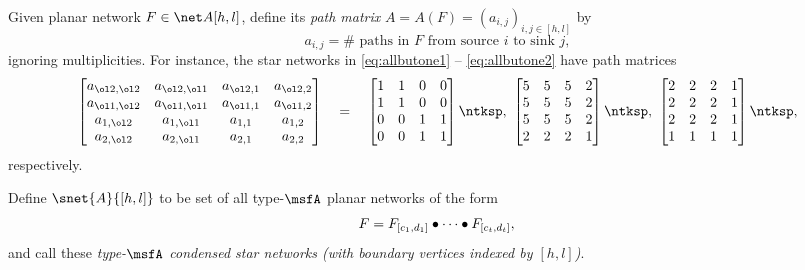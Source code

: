 Given planar network $F \in \net A{[h,l]}$, define
its {\em path matrix} $A = A(F) = (a_{i,j})_{i,j \in [h,l]}$ by
\begin{equation}\label{eq:pathmatrix}
  a_{i,j} = \# \text{ paths in $F$ from source $i$ to sink $j$},
\end{equation}
ignoring multiplicities.
For instance, the star networks in
\eqref{eq:allbutone1} -- \eqref{eq:allbutone2}
have path matrices
\begin{equation*}
  \begin{bmatrix}
    a_{\ol2,\ol2} & a_{\ol2, \ol1} & a_{\ol2, 1} & a_{\ol2, 2} \\
    a_{\ol1,\ol2} & a_{\ol1, \ol1} & a_{\ol1, 1} & a_{\ol1, 2} \\
    a_{1,\ol2}   & a_{1, \ol1}   & a_{1, 1}   & a_{1, 2} \\
    a_{2,\ol2}   & a_{2, \ol1}   & a_{2, 1}   & a_{2, 2} 
  \end{bmatrix}
  \quad
  = 
  \quad
  \begin{bmatrix}
    1 & 1 & 0 & 0 \\
    1 & 1 & 0 & 0 \\
    0 & 0 & 1 & 1 \\
    0 & 0 & 1 & 1     
  \end{bmatrix}\ntksp,
  \
  \begin{bmatrix}
    5 & 5 & 5 & 2 \\
    5 & 5 & 5 & 2 \\
    5 & 5 & 5 & 2 \\
    2 & 2 & 2 & 1
  \end{bmatrix}\ntksp,
  \
  \begin{bmatrix}
    2 & 2 & 2 & 1 \\
    2 & 2 & 2 & 1 \\
    2 & 2 & 2 & 1 \\
    1 & 1 & 1 & 1     
  \end{bmatrix}\ntksp,
\end{equation*}
respectively.

\begin{defn}\label{d:starnet}
Define $\snet{A}{[h,l]}$ to be set of all type-$\msfA$ planar networks of the
form
\begin{equation}\label{eq:bulletconcat}
    F = F_{[c_1,d_1]} \bullet \cdots \bullet F_{[c_t,d_t]}, \\
\end{equation}
and call these
{\em type-$\msfA$ condensed star networks
  (with boundary vertices indexed by $[h,l]$)}.
\end{defn}

